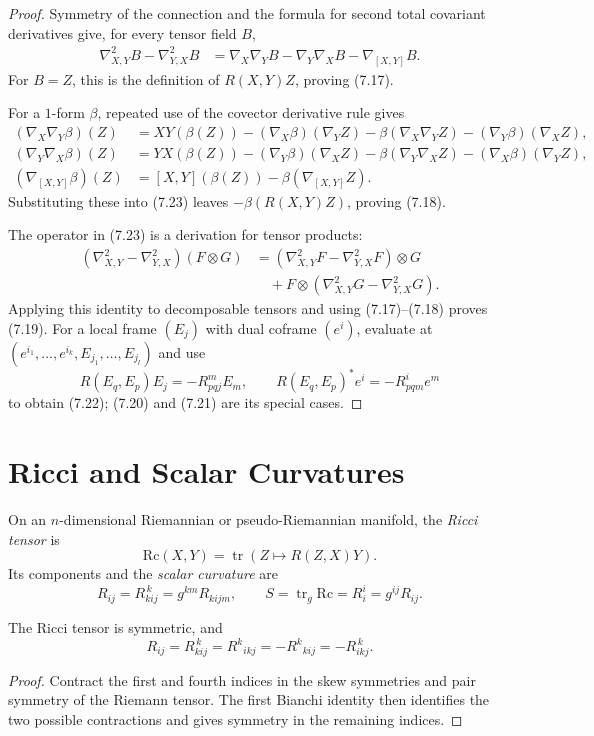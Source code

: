 \begin{proof}
\sketch Symmetry of the connection and the formula for second total
covariant derivatives give, for every tensor field $B$,
\begin{align}
\nabla^2_{X,Y}B-\nabla^2_{Y,X}B
&=\nabla_X\nabla_YB-\nabla_Y\nabla_XB-\nabla_{[X,Y]}B.
\tag{7.23}
\end{align}
For $B=Z$, this is the definition of $R(X,Y)Z$, proving (7.17).

For a $1$-form $\beta$, repeated use of the covector derivative rule gives
\begin{align}
(\nabla_X\nabla_Y\beta)(Z)
&=XY(\beta(Z))-(\nabla_X\beta)(\nabla_YZ)
-\beta(\nabla_X\nabla_YZ)
-(\nabla_Y\beta)(\nabla_XZ),
\tag{7.24}\\
(\nabla_Y\nabla_X\beta)(Z)
&=YX(\beta(Z))-(\nabla_Y\beta)(\nabla_XZ)
-\beta(\nabla_Y\nabla_XZ)
-(\nabla_X\beta)(\nabla_YZ),
\tag{7.25}\\
(\nabla_{[X,Y]}\beta)(Z)
&=[X,Y](\beta(Z))-\beta(\nabla_{[X,Y]}Z).
\tag{7.26}
\end{align}
Substituting these into (7.23) leaves
$-\beta(R(X,Y)Z)$, proving (7.18).

The operator in (7.23) is a derivation for tensor products:
\begin{align*}
(\nabla^2_{X,Y}-\nabla^2_{Y,X})(F\otimes G)
&=(\nabla^2_{X,Y}F-\nabla^2_{Y,X}F)\otimes G\\
&\quad+F\otimes
(\nabla^2_{X,Y}G-\nabla^2_{Y,X}G).
\end{align*}
Applying this identity to decomposable tensors and using (7.17)--(7.18)
proves (7.19). For a local frame $(E_j)$ with dual coframe $(e^i)$, evaluate
at $(e^{i_1},\ldots,e^{i_k},E_{j_1},\ldots,E_{j_l})$ and use
\[
R(E_q,E_p)E_j=-R_{pqj}^mE_m,\qquad
R(E_q,E_p)^*e^i=-R_{pqm}^ie^m
\]
to obtain (7.22); (7.20) and (7.21) are its special cases.
\end{proof}

\section{Ricci and Scalar Curvatures}

On an $n$-dimensional Riemannian or pseudo-Riemannian manifold, the
\emph{Ricci tensor} is
\[
\mathrm{Rc}(X,Y)=\operatorname{tr}(Z\mapsto R(Z,X)Y).
\]
Its components and the \emph{scalar curvature} are
\[
R_{ij}=R_{kij}^{\,k}=g^{km}R_{kijm},
\qquad
S=\operatorname{tr}_g\mathrm{Rc}=R_i^i=g^{ij}R_{ij}.
\]

\begin{lemma}
\label{lem:ricci-symmetries}

The Ricci tensor is symmetric, and
\[
R_{ij}=R_{kij}^{\,k}=R^k{}_{ikj}
=-R^k{}_{kij}=-R_{ikj}^{\,k}.
\]
\end{lemma}
\begin{proof}
\sketch
Contract the first and fourth indices in the skew symmetries and pair
symmetry of the Riemann tensor. The first Bianchi identity then identifies
the two possible contractions and gives symmetry in the remaining indices.
\end{proof}

